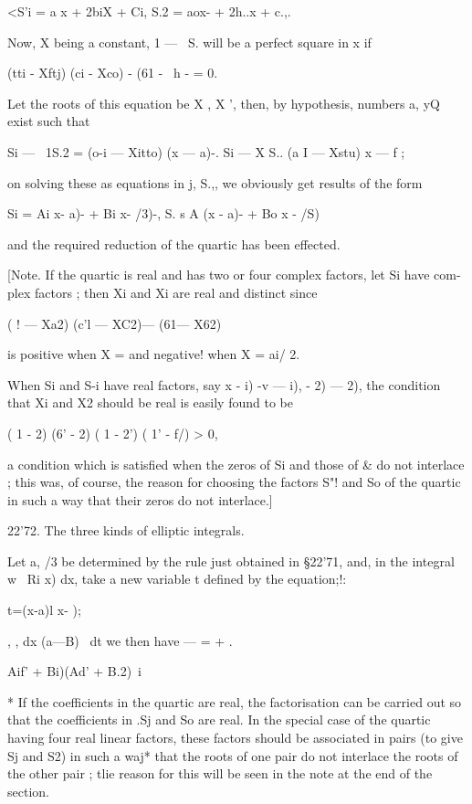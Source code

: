 <S'i = a x + 2biX + Ci, S.2 = aox- + 2h..x + c.,.

Now, X being a constant, 1 — \ S. will be a perfect square in x if

(tti - Xftj) (ci - Xco) - (61 - \ h - = 0.

Let the roots of this equation be X , X ', then, by hypothesis,
numbers a, yQ exist such that

Si — \ 1S.2 = (o-i — Xitto) (x — a)-. Si — X S.. (a I — Xstu) x — f ;

on solving these as equations in j, S.,, we obviously get results of
the form

Si = Ai x- a)- + Bi x- /3)-, S. s A (x - a)- + Bo x - /S)

and the required reduction of the quartic has been effected.

[Note. If the quartic is real and has two or four complex factors, let
Si have com- plex factors ; then Xi and Xi are real and distinct since

( ! — Xa2) (c'l — XC2)— (61— X62)

is positive when X = and negative! when X = ai/ 2.

When Si and S-i have real factors, say x - i) -v — i), - 2) — 2), the
condition that Xi and X2 should be real is easily found to be

( 1 - 2) (6' - 2) ( 1 - 2') ( 1' - f/) > 0,

a condition which is satisfied when the zeros of Si and those of \& do
not interlace ; this was, of course, the reason for choosing the
factors S"! and So of the quartic in such a way that their zeros do
not interlace.]

22'72. The three kinds of elliptic integrals.

Let a, /3 be determined by the rule just obtained in §22'71, and, in
the integral w~ Ri x) dx, take a new variable t defined by the
equation;!:

t=(x-a)l x- );

 , , dx (a—B)~ dt we then have — = + .

    Aif' + Bi)(Ad' + B.2)\ i

* If the coefficients in the quartic are real, the factorisation can
be carried out so that the coefficients in .Sj and So are real. In the
special case of the quartic having four real linear factors, these
factors should be associated in pairs (to give Sj and S2) in such a
waj* that the roots of one pair do not interlace the roots of the
other pair ; tlie reason for this will be seen in the note at the end
of the section.


